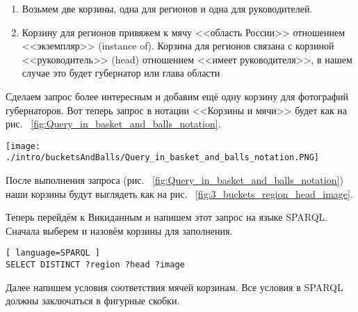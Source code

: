 \begin{enumerate}
    \item Возьмем две корзины, одна для регионов и одна для руководителей.
    \item Корзину для регионов привяжем к мячу <<область России>> отношением <<экземпляр>> (instance of). Корзина для регионов связана с корзиной <<руководитель>> (head) отношением <<имеет руководителя>>, в нашем случае это будет губернатор или глава области
\end{enumerate}

Сделаем запрос более интересным и добавим ещё одну корзину для фотографий губернаторов. Вот теперь запрос в нотации <<Корзины и мячи>> будет как на рис. ~\ref{fig:Query_in_basket_and_balls_notation}.

\begin{figure*}[h!]
    \texttt{[image: ./intro/bucketsAndBalls/Query\_in\_basket\_and\_balls\_notation.PNG]}
    \caption{Запрос в нотации <<Корзины и мячи>> для заполнения корзин <<регион>> мячами <<область России>>, <<руководитель>> ~--- губернаторами или главами области, <<изображение>> ~--- их фотографиями.}
	\label{fig:Query_in_basket_and_balls_notation}
\end{figure*}

\newpage
После выполнения запроса (рис. ~\ref{fig:Query_in_basket_and_balls_notation}) наши корзины будут выглядеть как на рис. ~\ref{fig:3_buckets_region_head_image}.

\begin{marginfigure}
	{
		\setlength{\fboxsep}{0pt}%
		\setlength{\fboxrule}{1pt}%
	}
    \caption{Корзины после выполнении запроса на рис. ~\ref{fig:Query_in_basket_and_balls_notation}. \textit{``?region``} ~--- это области России, \textit{``?head``} ~--- это руководители, \textit{``?image``} ~--- это фотографии руководства.}
	\label{fig:3_buckets_region_head_image}
\end{marginfigure}

Теперь перейдём к Викиданным и напишем этот запрос на языке SPARQL. Сначала выберем и назовём корзины для заполнения.

\begin{lstlisting}[ language=SPARQL ]
SELECT DISTINCT ?region ?head ?image
\end{lstlisting}

Далее напишем условия соответствия мячей корзинам. Все условия в SPARQL должны заключаться в фигурные скобки.

